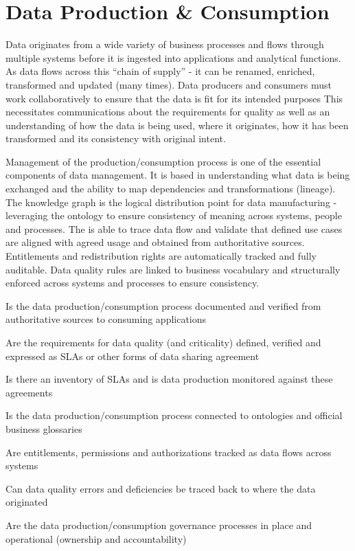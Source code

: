 \section{Data Production \& Consumption}\label{sec:ekgmm-b-4-3} %

Data originates from a wide variety of business processes and flows through multiple systems before it is ingested into applications and analytical functions.
As data flows across this “chain of supply” - it can be renamed, enriched, transformed and updated (many times).
Data producers and consumers must work collaboratively to ensure that the data is fit for its intended purposes
This necessitates communications about the requirements for quality as well as an understanding of how the data is being used,
where it originates, how it has been transformed and its consistency with original intent.

\kgmmekgrationalesection

Management of the production/consumption process is one of the essential components of data management.
It is based in understanding what data is being exchanged and the ability to map dependencies and transformations (lineage).
The knowledge graph is the logical distribution point for data manufacturing - leveraging the ontology to ensure consistency of meaning across systems, people and processes.
The  is able to trace data flow and validate that defined use cases are aligned with agreed usage and obtained from authoritative sources.
Entitlements and redistribution rights are automatically tracked and fully auditable.
Data quality rules are linked to business vocabulary and structurally enforced across systems and processes to ensure consistency.

\kgmmcorequestionssection

\begin{core-questions}

  \item [\thesection.1] Is the data production/consumption process documented and verified from authoritative sources to consuming applications
  \item [\thesection.2] Are the requirements for data quality (and criticality) defined, verified and expressed as SLAs or other forms of data sharing agreement
  \item [\thesection.3] Is there an inventory of SLAs and is data production monitored against these agreements
  \item [\thesection.4] Is the data production/consumption process connected to ontologies and official business glossaries
  \item [\thesection.5] Are entitlements, permissions and authorizations tracked as data flows across systems
  \item [\thesection.6] Can data quality errors and deficiencies be traced back to where the data originated
  \item [\thesection.7] Are the data production/consumption governance processes in place and operational (ownership and accountability)

\end{core-questions}

